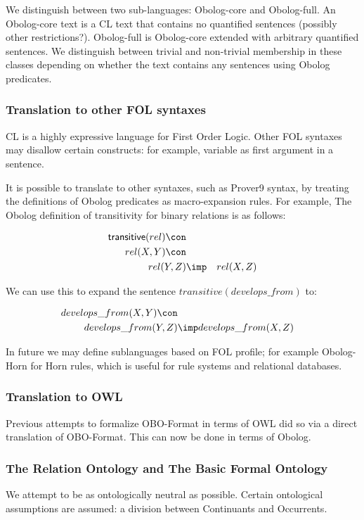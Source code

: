 We distinguish between two sub-languages: Obolog-core and
Obolog-full. An Obolog-core text is a CL text that contains no
quantified sentences (possibly other restrictions?).  Obolog-full is
Obolog-core extended with arbitrary quantified sentences. We
distinguish between trivial and non-trivial membership in these
classes depending on whether the text contains any sentences using
Obolog predicates.

\subsubsection{Translation to other FOL syntaxes}

CL is a highly expressive language for First Order Logic. Other FOL
syntaxes may disallow certain constructs: for example, variable as
first argument in a sentence.

It is possible to translate to other syntaxes, such as Prover9 syntax,
by treating the definitions of Obolog predicates as macro-expansion
rules. For example, The Obolog definition of transitivity for binary
relations is as follows:

\begin{eqnarray*}
 \pr{transitive}(rel) \con \\
rel(X, Y) \con \\
rel(Y, Z) &\imp &rel(X, Z) 
\end{eqnarray*}

We can use this to expand the sentence $transitive(develops\_from)$ to:

\begin{eqnarray*}
develops\_from(X, Y) \con \\
develops\_from(Y, Z) &\imp develops\_from(X, Z) 
\end{eqnarray*}

In future we may define sublanguages based on FOL profile; for example
Obolog-Horn for Horn rules, which is useful for rule systems and
relational databases.

\subsubsection{Translation to OWL}

Previous attempts to formalize OBO-Format in terms of OWL did so via a
direct translation of OBO-Format. This can now be done in terms of Obolog.

\subsubsection{The Relation Ontology and The Basic Formal Ontology}

We attempt to be as ontologically neutral as possible. Certain
ontological assumptions are assumed: a division between Continuants
and Occurrents. 

